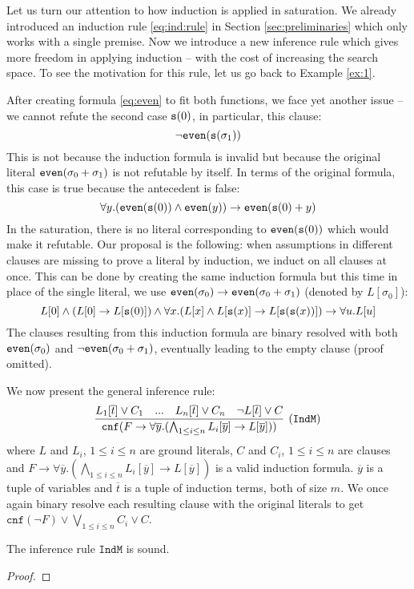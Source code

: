 
Let us turn our attention to how induction is applied in saturation. We already introduced an induction rule \eqref{eq:ind:rule} in Section \ref{sec:preliminaries} which only works with a single premise. Now we introduce a new inference rule which gives more freedom in applying induction -- with the cost of increasing the search space. To see the motivation for this rule, let us go back to Example \ref{ex:1}.

After creating formula \eqref{eq:even} to fit both functions, we face yet another issue -- we cannot refute the second case $\mathtt{s}(0)$, in particular, this clause:
$$\neg\mathtt{even}(\mathtt{s}(\sigma_1))$$
This is not because the induction formula is invalid but because the original literal $\mathtt{even}(\sigma_0+\sigma_1)$ is not refutable by itself. In terms of the original formula, this case is true because the antecedent is false:
$$\forall y. (\mathtt{even}(\mathtt{s}(0))\land\mathtt{even}(y))\rightarrow\mathtt{even}(\mathtt{s}(0)+y)$$
In the saturation, there is no literal corresponding to $\mathtt{even}(\mathtt{s}(0))$ which would make it refutable. Our proposal is the following: when assumptions in different clauses are missing to prove a literal by induction, we induct on all clauses at once. This can be done by creating the same induction formula but this time in place of the single literal, we use $\mathtt{even}(\sigma_0)\rightarrow\mathtt{even}(\sigma_0+\sigma_1)$ (denoted by $L[\sigma_0]$):
$$L[0]\land(L[0]\rightarrow L[\mathtt{s}(0)])\land\forall x.(L[x]\land L[\mathtt{s}(x)]\rightarrow L[\mathtt{s}(\mathtt{s}(x))])\rightarrow \forall u.L[u]$$
The clauses resulting from this induction formula are binary resolved with both $\mathtt{even}(\sigma_0)$ and $\neg\mathtt{even}(\sigma_0+\sigma_1)$, eventually leading to the empty clause (proof omitted).

We now present the general inference rule:
\begin{equation*}\label{eq:multind}
\infer[\small{\tt (IndM)}]{\mathtt{cnf}(F \rightarrow \forall \overline{y}.(\bigwedge_{1\le i\le n}L_i[\overline{y}]\rightarrow L[\overline{y}]))}{L_1[\overline{t}]\lor C_1\quad...\quad L_n[\overline{t}]\lor C_n\quad\lnot L[\overline{t}] \lor C}
\end{equation*}
where $L$ and $L_i$, $1\le i\le n$ are ground literals, $C$ and $C_i$, $1\le i\le n$ are clauses and $F \rightarrow \forall \overline{y}.(\bigwedge_{1\le i\le n}L_i[\overline{y}]\rightarrow L[\overline{y}])$ is a valid induction formula. $\overline{y}$ is a tuple of variables and $\overline{t}$ is a tuple of induction terms, both of size $m$. We once again binary resolve each resulting clause with the original literals to get $\mathtt{cnf}(\lnot F) \lor\bigvee_{1\le i\le n} C_i\lor C$.

\begin{theorem}
	The inference rule $\mathtt{IndM}$ is sound.
\end{theorem}
\begin{proof}
\end{proof}
